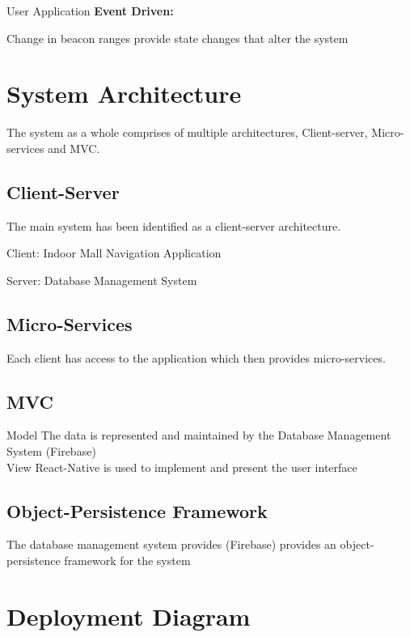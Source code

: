 \documentclass{article}
\begin{document}
User Application
\textbf{Event Driven:}

Change in beacon ranges provide state changes that alter the system

\section{System Architecture}

The system as a whole comprises of multiple architectures, Client-server, Micro-services and MVC. 

\subsection{Client-Server}
The main system has been identified as a client-server
architecture.\bigskip

Client: Indoor Mall Navigation Application 

Server: Database Management System

\subsection{Micro-Services}
Each client has access to the application which then provides micro-services. 

\subsection{MVC}
Model
The data is represented and maintained by the Database Management System (Firebase)\\
View
React-Native is used to implement and present the user interface\\


\subsection{Object-Persistence Framework}
The database management system provides (Firebase) provides an object-persistence framework for the system

\section{Deployment Diagram}
\begin{center}
\end{center}
\end{document}
